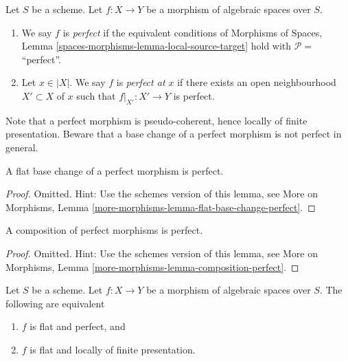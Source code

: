 \begin{definition}
\label{definition-perfect}
Let $S$ be a scheme.
Let $f : X \to Y$ be a morphism of algebraic spaces over $S$.
\begin{enumerate}
\item We say $f$ is {\it perfect} if the equivalent conditions of
Morphisms of Spaces, Lemma \ref{spaces-morphisms-lemma-local-source-target}
hold with $\mathcal{P} =$``perfect''.
\item Let $x \in |X|$. We say $f$ is {\it perfect at $x$} if
there exists an open neighbourhood $X' \subset X$ of $x$ such
that $f|_{X'} : X' \to Y$ is perfect.
\end{enumerate}
\end{definition}

\noindent
Note that a perfect morphism is pseudo-coherent, hence locally of finite
presentation. Beware that a base change of a perfect morphism is not perfect
in general.

\begin{lemma}
\label{lemma-flat-base-change-perfect}
A flat base change of a perfect morphism is perfect.
\end{lemma}

\begin{proof}
Omitted. Hint: Use the schemes version of this lemma, see
More on Morphisms,
Lemma \ref{more-morphisms-lemma-flat-base-change-perfect}.
\end{proof}

\begin{lemma}
\label{lemma-composition-perfect}
A composition of perfect morphisms is perfect.
\end{lemma}

\begin{proof}
Omitted. Hint: Use the schemes version of this lemma, see
More on Morphisms,
Lemma \ref{more-morphisms-lemma-composition-perfect}.
\end{proof}

\begin{lemma}
\label{lemma-flat-finite-presentation-perfect}
Let $S$ be a scheme. Let $f : X \to Y$ be a morphism of algebraic spaces over
$S$. The following are equivalent
\begin{enumerate}
\item $f$ is flat and perfect, and
\item $f$ is flat and locally of finite presentation.
\end{enumerate}
\end{lemma}

